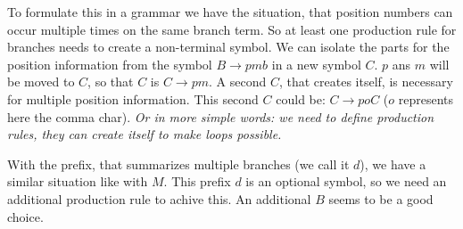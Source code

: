 \documentclass[a4paper,10pt]{article}
\begin{document}
To formulate this in a grammar we have the situation, that position numbers can occur multiple times on the same branch term. So at least one production rule for branches needs to create a non-terminal symbol. We can isolate the parts for the position information from the symbol $B \rightarrow pmb$ in a new symbol $C$. $p$ ans $m$ will be moved to $C$, so that $C$ is $C \rightarrow pm$. A second $C$, that creates itself, is necessary for multiple position information. This second $C$ could be: $C \rightarrow poC$ ($o$ represents here the comma char). \emph{Or in more simple words: we need to define production rules, they can create itself to make loops possible.}

With the prefix, that summarizes multiple branches (we call it $d$), we have a similar situation like with $M$. This prefix $d$ is an optional symbol, so we need an additional production rule to achive this. An additional $B$ seems to be a good choice.
\end{document}
